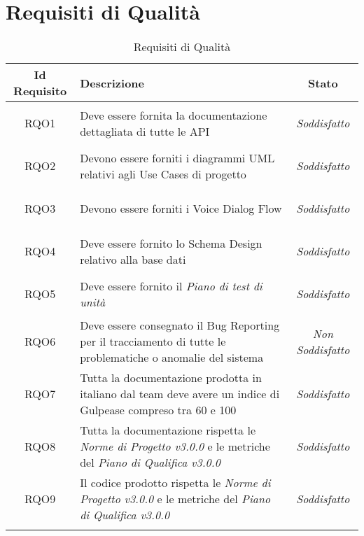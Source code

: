 \section{Requisiti di Qualità}
\normalsize
\begin{longtable}{|c|>{\centering}m{7cm}|c|}
	\hline
	\textbf{Id Requisito} & \textbf{Descrizione} & \textbf{Stato}\\
	\hline
	\endhead
	\hypertarget{RQO1}{RQO1} & Deve essere fornita la documentazione dettagliata di tutte le API & \textit{Soddisfatto}\\ \hline
	
	\hypertarget{RQO2}{RQO2} & Devono essere forniti i diagrammi UML relativi agli Use Cases di progetto & \textit{Soddisfatto}\\ \hline
	
	\hypertarget{RQO3}{RQO3} & Devono essere forniti i Voice Dialog Flow & \textit{Soddisfatto}\\ \hline
	
	\hypertarget{RQO4}{RQO4} & Deve essere fornito lo Schema Design relativo alla base dati & \textit{Soddisfatto}\\ \hline
	
	\hypertarget{RQO5}{RQO5} & Deve essere fornito il \textit{Piano di test di unità} & \textit{Soddisfatto}\\ \hline
	
	\hypertarget{RQO6}{RQO6} & Deve essere consegnato il Bug Reporting per il tracciamento di tutte le problematiche o anomalie del sistema & \textit{Non Soddisfatto}\\ \hline
	
	\hypertarget{RQO7}{RQO7} & Tutta la documentazione prodotta in italiano dal team deve avere un indice di Gulpease compreso tra 60 e 100 & \textit{Soddisfatto}\\ \hline
	
	\hypertarget{RQO8}{RQO8} & Tutta la documentazione rispetta le \textit{Norme di Progetto v3.0.0} e le metriche del \textit{Piano di Qualifica v3.0.0} & \textit{Soddisfatto}\\ \hline
	
	\hypertarget{RQO9}{RQO9} & Il codice prodotto rispetta le \textit{Norme di Progetto v3.0.0} e le metriche del \textit{Piano di Qualifica v3.0.0} & \textit{Soddisfatto}\\ \hline
	
	\caption[Requisiti di Qualità]{Requisiti di Qualità}
	\label{tabella:req2}
\end{longtable}
\clearpage
